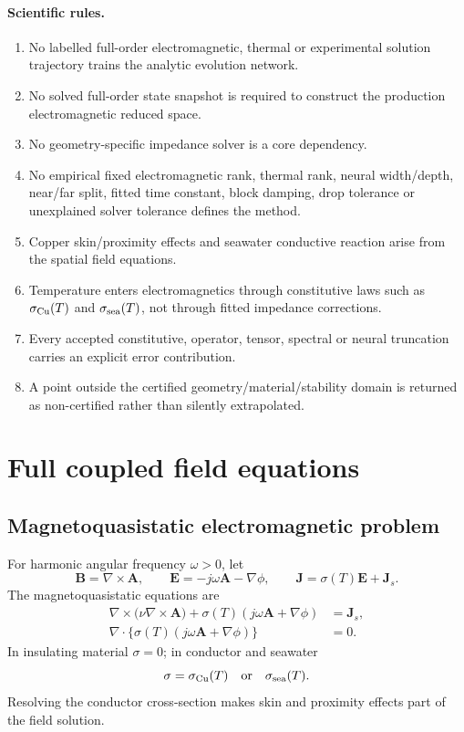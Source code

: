 \documentclass[11pt]{article}
\theoremstyle{remark}
\begin{document}
\paragraph{Scientific rules.}
\begin{enumerate}[label=(R\arabic*)]
\item No labelled full-order electromagnetic, thermal or experimental solution trajectory trains the analytic evolution network.
\item No solved full-order state snapshot is required to construct the production electromagnetic reduced space.
\item No geometry-specific impedance solver is a core dependency.
\item No empirical fixed electromagnetic rank, thermal rank, neural width/depth, near/far split, fitted time constant, block damping, drop tolerance or unexplained solver tolerance defines the method.
\item Copper skin/proximity effects and seawater conductive reaction arise from the spatial field equations.
\item Temperature enters electromagnetics through constitutive laws such as \(\sigma_{\rm Cu}(T)\) and \(\sigma_{\rm sea}(T)\), not through fitted impedance corrections.
\item Every accepted constitutive, operator, tensor, spectral or neural truncation carries an explicit error contribution.
\item A point outside the certified geometry/material/stability domain is returned as non-certified rather than silently extrapolated.
\end{enumerate}

\section{Full coupled field equations}

\subsection{Magnetoquasistatic electromagnetic problem}
For harmonic angular frequency \(\omega>0\), let
\[
\mathbf B=\nabla\times\mathbf A,
\qquad
\mathbf E=-j\omega\mathbf A-\nabla\phi,
\qquad
\mathbf J=\sigma(T)\mathbf E+\mathbf J_s.
\]
The magnetoquasistatic equations are
\begin{align}
\nabla\times\bigl(\nu\nabla\times\mathbf A\bigr)
+\sigma(T)(j\omega\mathbf A+\nabla\phi)&=\mathbf J_s,\\
\nabla\cdot\{\sigma(T)(j\omega\mathbf A+\nabla\phi)\}&=0.
\end{align}
In insulating material \(\sigma=0\); in conductor and seawater
\[
\sigma=\sigma_{\rm Cu}(T)
\quad\text{or}\quad
\sigma_{\rm sea}(T).
\]
Resolving the conductor cross-section makes skin and proximity effects part of the field solution.
\end{document}
